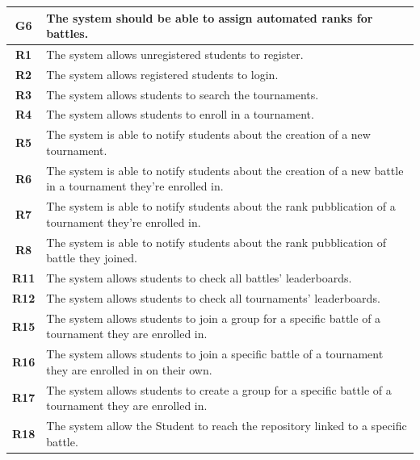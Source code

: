 \documentclass[12pt, a4paper]{report}
\begin{document}
    \begin{table}[H]
        \begin{tabularx}{\textwidth}{cX}
        \textbf{G6} & The system should be able to assign automated ranks for battles. \\
        \hline
        \textbf{R1}  & The system allows unregistered students to register.                             \\
        \textbf{R2}  & The system allows registered students to login.                                  \\
        \textbf{R3}  & The system allows students to search the tournaments.                            \\
        \textbf{R4}  & The system allows students to enroll in a tournament.                            \\
        \textbf{R5}  & The system is able to notify students about the creation of a new tournament.    \\
        \textbf{R6}  & The system is able to notify students about the creation of a new battle
                        in a tournament they’re enrolled in.                                            \\
        \textbf{R7}  & The system is able to notify students about the rank pubblication of a tournament they’re enrolled in.\\
        \textbf{R8}  & The system is able to notify students about the rank pubblication of battle they joined.\\
        \textbf{R11}  & The system allows students to check all battles’ leaderboards.\\
        \textbf{R12}  & The system allows students to check all tournaments’ leaderboards.\\
        \textbf{R15} & The system allows students to join a group for a specific battle of a
                        tournament they are enrolled in.     \\
        \textbf{R16} & The system allows students to join a specific battle of a tournament
                        they are enrolled in on their own.\\
        \textbf{R17} & The system allows students to create a group for a specific battle of a
                        tournament they are enrolled in. \\
        \textbf{R18} & The system allow the Student to reach the repository linked to a specific
                        battle.\\

\end{tabularx}
\end{table}
\end{document}
